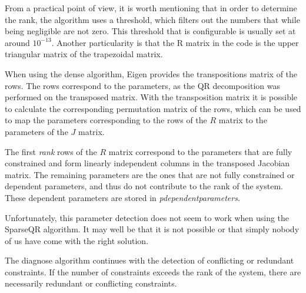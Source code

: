 \documentclass[12pt,twoside,a4paper]{book}
\begin{document}
    From a practical point of view, it is worth mentioning that in order to determine the rank, the algorithm uses a threshold, which filters out the numbers that while being negligible are not zero. This threshold that is configurable is usually set at around $10^{-13}$. Another particularity is that the R matrix in the code is the upper triangular matrix of the trapezoidal matrix.

    When using the dense algorithm, Eigen provides the transpositions matrix of the rows. The rows correspond to the parameters, as the QR decomposition was performed on the transposed matrix. With the transposition matrix it is possible to calculate the corresponding permutation matrix of the rows, which can be used to map the parameters corresponding to the rows of the $R$ matrix to the parameters of the $J$ matrix.

    The first \emph{rank} rows of the $R$ matrix correspond to the parameters that are fully constrained and form linearly independent columns in the transposed Jacobian matrix. The remaining parameters are the ones that are not fully constrained or dependent parameters, and thus do not contribute to the rank of the system. These dependent parameters are stored in \emph{pdependentparameters}.

    Unfortunately, this parameter detection does not seem to work when using the SparseQR algorithm. It may well be that it is not possible or that simply nobody of us have come with the right solution.

    The diagnose algorithm continues with the detection of conflicting or redundant constraints. If the number of constraints exceeds the rank of the system, there are necessarily redundant or conflicting constraints.
\end{document}
